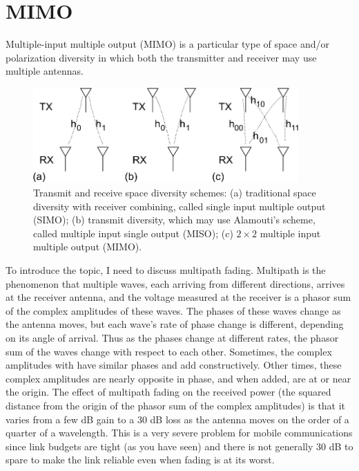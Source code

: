 



\section{MIMO}

Multiple-input multiple output (MIMO) is a particular type of space and/or polarization diversity in which both the transmitter and receiver may use multiple antennas.  

\begin{figure}[htbp]
\centerline{ \includegraphics[width=4in]{images/mrc_and_mimo.png} }
\caption{Transmit and receive space diversity schemes: (a) traditional space diversity with receiver combining, called single input multiple output (SIMO); (b) transmit diversity, which may use Alamouti's scheme, called multiple input single output (MISO); (c) $2\times 2$ multiple input multiple output (MIMO).}
    \label{F:mrc_and_mimo}
\end{figure}

To introduce the topic, I need to discuss multipath fading.  Multipath is the phenomenon that multiple waves, each arriving from different directions, arrives at the receiver antenna, and the voltage measured at the receiver is a phasor sum of the complex amplitudes of these waves. The phases of these waves change as the antenna moves, but each wave's rate of phase change is different, depending on its angle of arrival. Thus as the phases change at different rates, the phasor sum of the waves change with respect to each other.  Sometimes, the complex amplitudes with have similar phases and add constructively.  Other times, these complex amplitudes are nearly opposite in phase, and when added, are at or near the origin.     The effect of multipath fading on the received power (the squared distance from the origin of the phasor sum of the complex amplitudes) is that it varies from a few dB gain to a 30 dB loss as the antenna moves on the order of a quarter of a wavelength.  This is a very severe problem for mobile communications since link budgets are tight (as you have seen) and there is not generally 30 dB to spare to make the link reliable even when fading is at its worst. 


